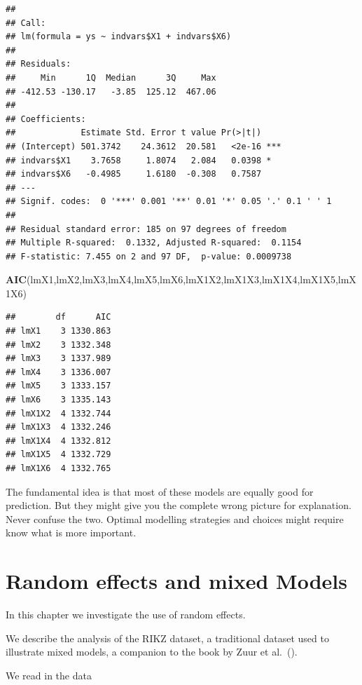 \documentclass[
]{book}
\newenvironment{Shaded}{\begin{snugshade}}{\end{snugshade}}
\newcommand{\CommentTok}[1]{\textcolor[rgb]{0.56,0.35,0.01}{\textit{#1}}}
\newcommand{\DecValTok}[1]{\textcolor[rgb]{0.00,0.00,0.81}{#1}}
\newcommand{\FunctionTok}[1]{\textcolor[rgb]{0.13,0.29,0.53}{\textbf{#1}}}
\newcommand{\NormalTok}[1]{#1}
\newcommand{\OtherTok}[1]{\textcolor[rgb]{0.56,0.35,0.01}{#1}}
\newcommand{\SpecialCharTok}[1]{\textcolor[rgb]{0.81,0.36,0.00}{\textbf{#1}}}
\newcommand{\StringTok}[1]{\textcolor[rgb]{0.31,0.60,0.02}{#1}}
\begin{document}
\begin{verbatim}
## 
## Call:
## lm(formula = ys ~ indvars$X1 + indvars$X6)
## 
## Residuals:
##     Min      1Q  Median      3Q     Max 
## -412.53 -130.17   -3.85  125.12  467.06 
## 
## Coefficients:
##             Estimate Std. Error t value Pr(>|t|)    
## (Intercept) 501.3742    24.3612  20.581   <2e-16 ***
## indvars$X1    3.7658     1.8074   2.084   0.0398 *  
## indvars$X6   -0.4985     1.6180  -0.308   0.7587    
## ---
## Signif. codes:  0 '***' 0.001 '**' 0.01 '*' 0.05 '.' 0.1 ' ' 1
## 
## Residual standard error: 185 on 97 degrees of freedom
## Multiple R-squared:  0.1332, Adjusted R-squared:  0.1154 
## F-statistic: 7.455 on 2 and 97 DF,  p-value: 0.0009738
\end{verbatim}

\begin{Shaded}
\begin{Highlighting}[]
\FunctionTok{AIC}\NormalTok{(lmX1,lmX2,lmX3,lmX4,lmX5,lmX6,lmX1X2,lmX1X3,lmX1X4,lmX1X5,lmX1X6)}
\end{Highlighting}
\end{Shaded}

\begin{verbatim}
##        df      AIC
## lmX1    3 1330.863
## lmX2    3 1332.348
## lmX3    3 1337.989
## lmX4    3 1336.007
## lmX5    3 1333.157
## lmX6    3 1335.143
## lmX1X2  4 1332.744
## lmX1X3  4 1332.246
## lmX1X4  4 1332.812
## lmX1X5  4 1332.729
## lmX1X6  4 1332.765
\end{verbatim}

The fundamental idea is that most of these models are equally good for prediction. But they might give you the complete wrong picture for explanation. Never confuse the two. Optimal modelling strategies and choices might require know what is more important.

\hypertarget{aula17}{%
\chapter{Random effects and mixed Models}\label{aula17}}

In this chapter we investigate the use of random effects.

We describe the analysis of the RIKZ dataset, a traditional dataset used to illustrate mixed models, a companion to the book by Zuur et al.~().

We read in the data

\begin{Shaded}
\end{Shaded}
\end{document}
